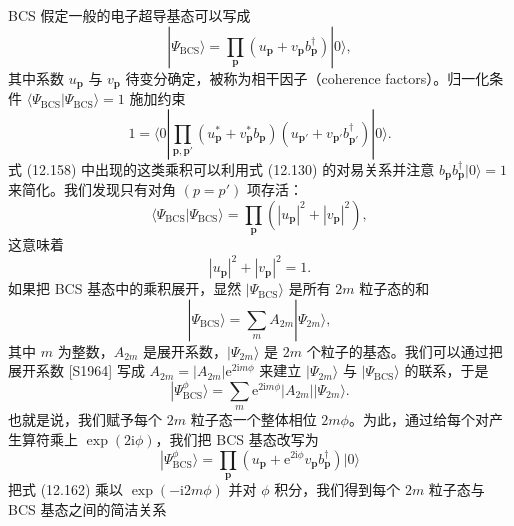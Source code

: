 BCS 假定一般的电子超导基态可以写成
\begin{equation*}
|\Psi_{\mathrm{BCS}}\rangle=\prod_{\mathbf p}\left(u_{\mathbf p}+v_{\mathbf p}b^\dagger_{\mathbf p}\right)|0\rangle, \tag{12.157}
\end{equation*}
其中系数 $u_{\mathbf p}$ 与 $v_{\mathbf p}$ 待变分确定，被称为相干因子（coherence factors）。归一化条件 $\langle\Psi_{\mathrm{BCS}}|\Psi_{\mathrm{BCS}}\rangle=1$ 施加约束
\begin{equation*}
1=\langle 0|\prod_{\mathbf p,\mathbf p'}\left(u^*_{\mathbf p}+v^*_{\mathbf p}b_{\mathbf p}\right)\left(u_{\mathbf p'}+v_{\mathbf p'}b^\dagger_{\mathbf p'}\right)|0\rangle. \tag{12.158}
\end{equation*}
式 (12.158) 中出现的这类乘积可以利用式 (12.130) 的对易关系并注意 $b_{\mathbf p}b^\dagger_{\mathbf p}|0\rangle=1$ 来简化。我们发现只有对角 $\left(p=p'\right)$ 项存活：
\begin{equation*}
\langle\Psi_{\mathrm{BCS}}|\Psi_{\mathrm{BCS}}\rangle=\prod_{\mathbf p}\left(\left|u_{\mathbf p}\right|^2+\left|v_{\mathbf p}\right|^2\right), \tag{12.159}
\end{equation*}
这意味着
\begin{equation*}
\left|u_{\mathbf p}\right|^2+\left|v_{\mathbf p}\right|^2=1. \tag{12.160}
\end{equation*}
如果把 BCS 基态中的乘积展开，显然 $|\Psi_{\mathrm{BCS}}\rangle$ 是所有 $2m$ 粒子态的和
\begin{equation*}
|\Psi_{\mathrm{BCS}}\rangle=\sum_m A_{2m}|\Psi_{2m}\rangle, \tag{12.161}
\end{equation*}
其中 $m$ 为整数，$A_{2m}$ 是展开系数，$|\Psi_{2m}\rangle$ 是 $2m$ 个粒子的基态。我们可以通过把展开系数 [S1964] 写成 $A_{2m}=|A_{2m}|\mathrm e^{2\mathrm i m\phi}$ 来建立 $|\Psi_{2m}\rangle$ 与 $|\Psi_{\mathrm{BCS}}\rangle$ 的联系，于是
\begin{equation*}
\left|\Psi^{\phi}_{\mathrm{BCS}}\right.\rangle=\sum_m\mathrm e^{2\mathrm i m\phi}|A_{2m}||\Psi_{2m}\rangle. \tag{12.162}
\end{equation*}
也就是说，我们赋予每个 $2m$ 粒子态一个整体相位 $2m\phi$。为此，通过给每个对产生算符乘上 $\exp(2\mathrm i\phi)$，我们把 BCS 基态改写为
\begin{equation*}
\left|\Psi^{\phi}_{\mathrm{BCS}}\right.\rangle=\prod_{\mathbf p}\left(u_{\mathbf p}+\mathrm e^{2\mathrm i\phi}v_{\mathbf p}b^\dagger_{\mathbf p}\right)\left|0\right.\rangle \tag{12.163}
\end{equation*}
把式 (12.162) 乘以 $\exp(-\mathrm i 2m\phi)$ 并对 $\phi$ 积分，我们得到每个 $2m$ 粒子态与 BCS 基态之间的简洁关系
